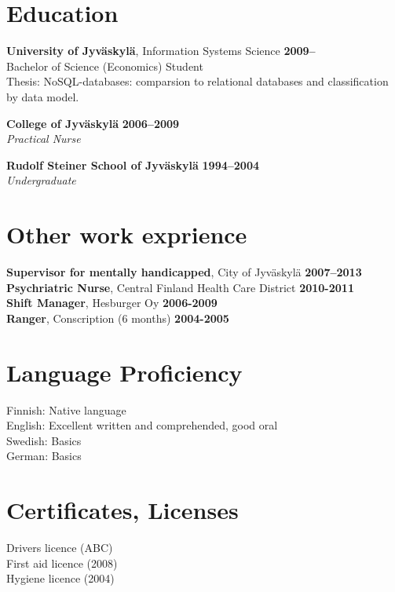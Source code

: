 \documentclass[margin,line]{resume}
\begin{document}
\begin{resume}
\section{\mysidestyle Education}

\textbf{University of Jyväskylä}, Information Systems Science \hfill \textbf{2009--} \\
Bachelor of Science (Economics) Student \\
Thesis: NoSQL-databases: comparsion to relational databases and classification by data model.

\textbf{College of Jyväskylä} \hfill \textbf{ 2006--2009}\\
\textsl{Practical Nurse} 

\textbf{Rudolf Steiner School of Jyväskylä} \hfill \textbf{1994--2004}\\
\textsl{Undergraduate} 

\section{\mysidestyle Other work exprience}
\textbf{Supervisor for mentally handicapped}, City of Jyväskylä \hfill\textbf{2007--2013}\\
\textbf{Psychriatric Nurse}, Central Finland Health Care District
\hfill\textbf{2010-2011}\\
\textbf{Shift Manager}, Hesburger Oy \hfill\textbf{2006-2009}\\
\textbf{Ranger}, Conscription (6 months) \hfill\textbf{2004-2005} 
\pagebreak 
  
\section{\mysidestyle Language Proficiency}
Finnish: Native language \\ 
English: Excellent written and comprehended, good oral \\ 
Swedish: Basics \\ 
German: Basics 

\section{\mysidestyle Certificates, Licenses} 
Drivers licence (ABC) \\
First aid licence (2008) \\
Hygiene licence (2004) \\

\end{resume}
\end{document}
